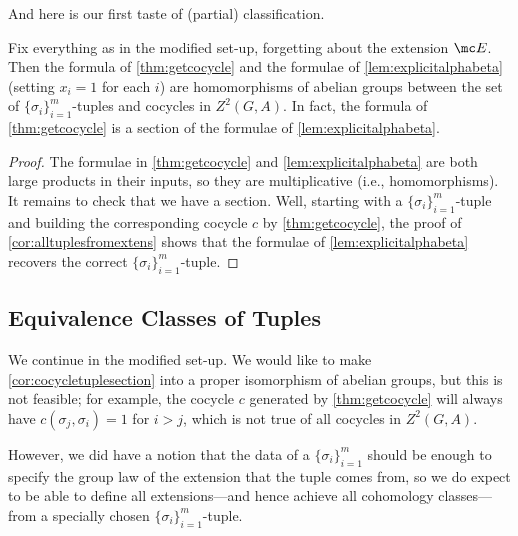 \documentclass{article}
\numberwithin{equation}{section}
\begin{document}
And here is our first taste of (partial) classification.
\begin{cor} \label{cor:cocycletuplesection}
	Fix everything as in the modified set-up, forgetting about the extension $\mc E$. Then the formula of \autoref{thm:getcocycle} and the formulae of \autoref{lem:explicitalphabeta} (setting $x_i=1$ for each $i$) are homomorphisms of abelian groups between the set of $\{\sigma_i\}_{i=1}^m$-tuples and cocycles in $Z^2( G,A)$. In fact, the formula of \autoref{thm:getcocycle} is a section of the formulae of \autoref{lem:explicitalphabeta}.
\end{cor}
\begin{proof}
	The formulae in \autoref{thm:getcocycle} and \autoref{lem:explicitalphabeta} are both large products in their inputs, so they are multiplicative (i.e., homomorphisms). It remains to check that we have a section. Well, starting with a $\{\sigma_i\}_{i=1}^m$-tuple and building the corresponding cocycle $c$ by \autoref{thm:getcocycle}, the proof of \autoref{cor:alltuplesfromextens} shows that the formulae of \autoref{lem:explicitalphabeta} recovers the correct $\{\sigma_i\}_{i=1}^m$-tuple.
\end{proof}

\subsection{Equivalence Classes of Tuples}
We continue in the modified set-up. We would like to make \autoref{cor:cocycletuplesection} into a proper isomorphism of abelian groups, but this is not feasible; for example, the cocycle $c$ generated by \autoref{thm:getcocycle} will always have $c(\sigma_j,\sigma_i)=1$ for $i>j$, which is not true of all cocycles in $Z^2( G,A)$.

However, we did have a notion that the data of a $\{\sigma_i\}_{i=1}^m$ should be enough to specify the group law of the extension that the tuple comes from, so we do expect to be able to define all extensions---and hence achieve all cohomology classes---from a specially chosen $\{\sigma_i\}_{i=1}^m$-tuple.
\end{document}
